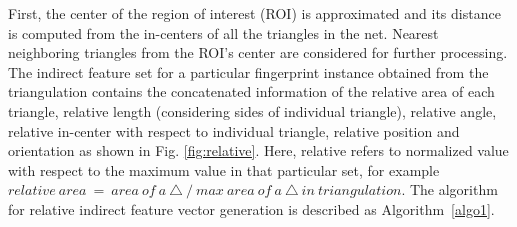 First, the center of the region of interest (ROI) is approximated and
its distance is computed from the in-centers of all the triangles in the net.
Nearest neighboring triangles from the ROI's center are considered for further
processing. The indirect feature set for a particular fingerprint instance
obtained from the triangulation contains the concatenated information of
the relative area of each triangle, relative length (considering sides of
individual triangle), relative angle, relative in-center with respect to
individual
triangle, relative position and orientation as shown in Fig. \ref{fig:relative}.
Here, relative refers to normalized value with respect to the maximum value in
that particular set, for example $relative~ area~ =~ area~ of~ a~ \triangle~ /~
	max~ area ~of~ a~ \triangle~in~ triangulation$. The algorithm for relative
indirect feature vector generation is described as Algorithm~\ref{algo1}.\par
